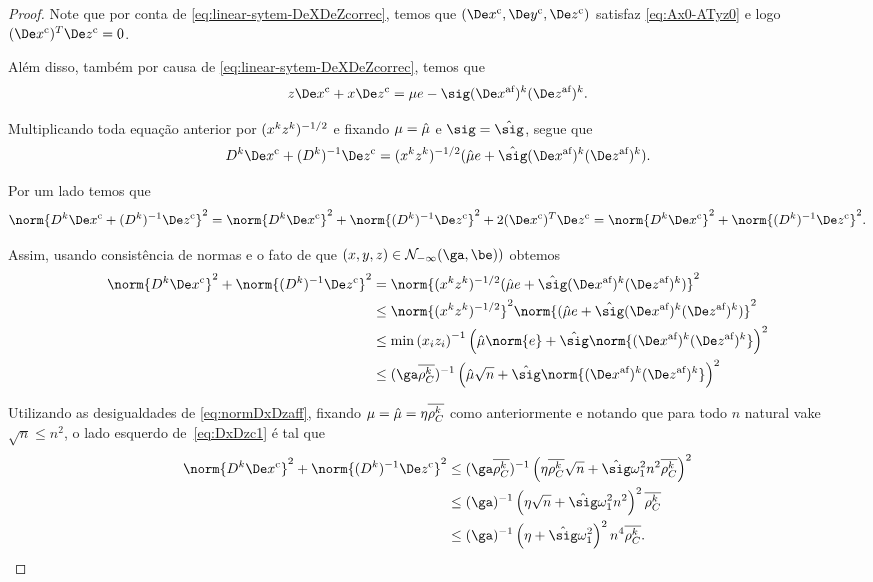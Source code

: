 \begin{proof}
	Note que por conta de \eqref{eq:linear-sytem-DeXDeZcorrec}, temos que $(\Decox,\Decoy,\Decoz)$ satisfaz \eqref{eq:Ax0-ATyz0} e logo $(\Decox)^{T}\Decoz = 0$. 

	


	Além disso, também por causa de \eqref{eq:linear-sytem-DeXDeZcorrec}, temos que
	\[
	z\Decox + x\Decoz = \mu e  - \sig \dekx  \dekz .
	\]

	Multiplicando toda equação anterior por $(  x^{k} z^{k}  )^{-1/2}$ e  fixando $\mu = \hat{\mu}$ e $\sig = \nextsig $, segue que 
	\[
		\Dk\Decox + \Dik\Decoz = (  \xk \zk  )^{-1/2}(\nextmu e + \nextsig \dekx  \dekz ).
	\] 

	Por um lado temos que 
	\[
		\norm{\Dk\Decox + \Dik\Decoz}^{2} = \norm{\Dk\Decox}^{2} + \norm{\Dik\Decoz}^{2} + 2(\Decox)^{T}\Decoz = \norm{\Dk\Decox}^{2} + \norm{\Dik\Decoz}^{2}.
	\]

Assim, usando consistência de normas e o fato de que  $(x,y,z)\in\Nset_{-\infty}(\ga,\be))$ obtemos
\begin{align}
	\norm{\Dk\Decox}^{2} + \norm{\Dik\Decoz}^{2} & = \norm{(  \xk \zk  )^{-1/2}(\nextmu e+ \nextsig \dekx  \dekz )}^{2} \notag\\ 
												& \leq \norm{(  \xk \zk  )^{-1/2}}^{2}\norm{(\nextmu e+ \nextsig \dekx  \dekz )}^{2} \notag\\ 
												& \leq \min\left({x_iz_i}\right)^{-1}\left(\nextmu\norm{ e} +{\nextsig}\norm{ \dekx  \dekz }\right)^{2}\notag\\
												& \leq (\ga\dbvec{\rho_C^k })^{-1}\left(\nextmu\sqrt{n} +{\nextsig}\norm{ \dekx  \dekz }\right)^{2} \label{eq:DxDzc1}		
\end{align}



Utilizando as desigualdades de \eqref{eq:normDxDzaff}, fixando $\mu = \hat{\mu} =\eta \overline{\rho_C^k }$ como anteriormente e notando que para todo $n$ natural vake $\sqrt{n} \leq n^{2}$, o lado esquerdo de~\eqref{eq:DxDzc1} é tal que
\[
\begin{aligned}
	\norm{\Dk\Decox}^{2} + \norm{\Dik\Decoz}^{2}
							& \leq (\ga\dbvec{\rho_C^k })^{-1}\left(\eta\dbvec{\rho_C^k }\sqrt{n} +{\nextsig} \omega_1^{2} n^{2}\dbvec{\rho_C^k }\right)^{2}\\
							& \leq (\ga)^{-1}\left(\eta\sqrt{n} +{\nextsig} \omega_1^{2} n^{2}\right)^{2}\dbvec{\rho_C^k }\\
							& \leq (\ga)^{-1}\left(\eta +{\nextsig} \omega_1^{2} \right)^{2}n^{4}\dbvec{\rho_C^k }.
\end{aligned}
\]


\end{proof}
